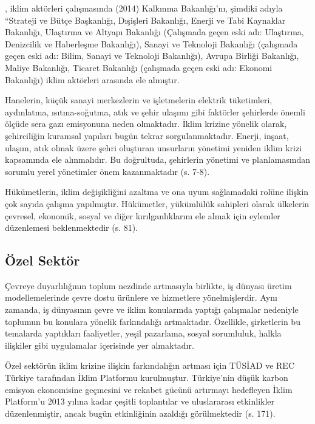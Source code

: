 \documentclass[
]{book}
\begin{document}
\citet{sahin2014turkiye}, iklim aktörleri çalışmasında (2014) Kalkınma Bakanlığı'nı, şimdiki adıyla ``Strateji ve Bütçe Başkanlığı, Dışişleri Bakanlığı, Enerji ve Tabi Kaynaklar Bakanlığı, Ulaştırma ve Altyapı Bakanlığı (Çalışmada geçen eski adı: Ulaştırma, Denizcilik ve Haberleşme Bakanlığı), Sanayi ve Teknoloji Bakanlığı (çalışmada geçen eski adı: Bilim, Sanayi ve Teknoloji Bakanlığı), Avrupa Birliği Bakanlığı, Maliye Bakanlığı, Ticaret Bakanlığı (çalışmada geçen eski adı: Ekonomi Bakanlığı) iklim aktörleri arasında ele almıştır.

Hanelerin, küçük sanayi merkezlerin ve işletmelerin elektrik tüketimleri, aydınlatma, ısıtma-soğutma, atık ve şehir ulaşımı gibi faktörler şehirlerde önemli ölçüde sera gazı emisyonuna neden olmaktadır. İklim krizine yönelik olarak, şehirciliğin kuramsal yapıları bugün tekrar sorgulanmaktadır. Enerji, inşaat, ulaşım, atık olmak üzere şehri oluşturan unsurların yönetimi yeniden iklim krizi kapsamında ele alınmalıdır. Bu doğrultuda, şehirlerin yönetimi ve planlamasından sorumlu yerel yönetimler önem kazanmaktadır (s. 7-8). \citep{talu2019iklim}

Hükümetlerin, iklim değişikliğini azaltma ve ona uyum sağlamadaki rolüne ilişkin çok sayıda çalışma yapılmıştır. Hükümetler, yükümlülük sahipleri olarak ülkelerin çevresel, ekonomik, sosyal ve diğer kırılganlıklarını ele almak için eylemler düzenlemesi beklenmektedir (s. 81). \citep{fe2019philippine}

\hypertarget{uxf6zel-sektuxf6r}{%
\subsection{Özel Sektör}\label{uxf6zel-sektuxf6r}}

Çevreye duyarlılığının toplum nezdinde artmasıyla birlikte, iş dünyası üretim modellemelerinde çevre dostu ürünlere ve hizmetlere yönelmişlerdir. Aynı zamanda, iş dünyasının çevre ve iklim konularında yaptığı çalışmalar nedeniyle toplumun bu konulara yönelik farkındalığı artmaktadır. Özellikle, şirketlerin bu temalarda yaptıkları faaliyetler, yeşil pazarlama, sosyal sorumluluk, halkla ilişkiler gibi uygulamalar içerisinde yer almaktadır.

Özel sektörün iklim krizine ilişkin farkındalığın artması için TÜSİAD ve REC Türkiye tarafından İklim Platformu kurulmuştur. Türkiye'nin düşük karbon emisyon ekonomisine geçmesini ve rekabet gücünü artırmayı hedefleyen İklim Platform'u 2013 yılına kadar çeşitli toplantılar ve uluslararası etkinlikler düzenlenmiştir, ancak bugün etkinliğinin azaldığı görülmektedir (s. 171). \citep{sahin2014turkiye}
\end{document}

